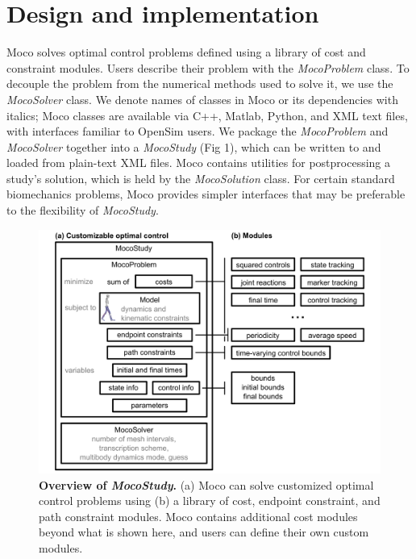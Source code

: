\documentclass[10pt,letterpaper]{article}
\begin{document}
\section*{Design and implementation}

Moco solves optimal control problems defined using a library of cost and constraint modules. Users describe their problem with the \textit{MocoProblem} class. To decouple the problem from the numerical methods used to solve it, we use the \textit{MocoSolver} class. We denote names of classes in Moco or its dependencies with italics; Moco classes are available via C++, Matlab, Python, and XML text files, with interfaces familiar to OpenSim users. We package the \textit{MocoProblem} and \textit{MocoSolver} together into a \textit{MocoStudy} (Fig 1), which can be written to and loaded from plain-text XML files. Moco contains utilities for postprocessing a study’s solution, which is held by the \textit{MocoSolution} class. For certain standard biomechanics problems, Moco provides simpler interfaces that may be preferable to the flexibility of \textit{MocoStudy}.

\begin{figure}[!h]
\centering
    \includegraphics{../figures/MocoStudyDiagram.png}
    \caption{{\bf Overview of \textit{MocoStudy}.}
    (a) Moco can solve customized optimal control problems using (b) a library of cost, endpoint constraint, and path constraint modules. Moco contains additional cost modules beyond what is shown here, and users can define their own custom modules.}
    \label{mocodiagram}
\end{figure}
\end{document}
